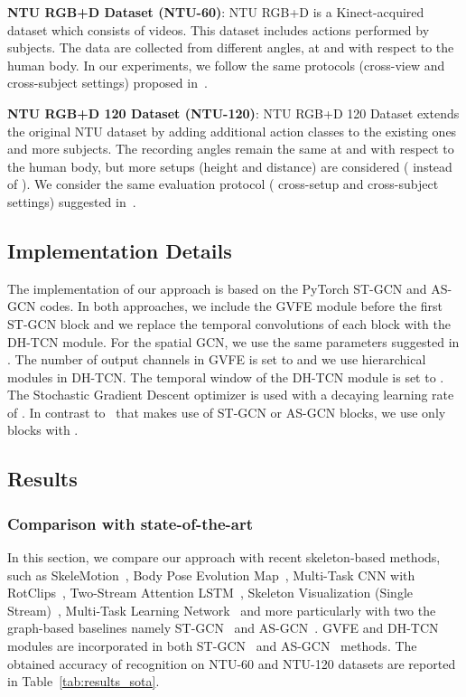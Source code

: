 \documentclass{article}
\begin{document}
\textbf{NTU RGB+D Dataset (NTU-60)}: NTU RGB+D is a Kinect-acquired dataset which consists of  videos. This dataset includes  actions performed by  subjects. The data are collected from  different angles, at  and  with respect to the human body. In our experiments, we follow the same protocols (cross-view and cross-subject settings) proposed in~\cite{Shahroudy_2016_NTURGBD}.

\noindent \textbf{NTU RGB+D 120 Dataset (NTU-120)}: NTU RGB+D 120 Dataset extends the original NTU dataset by adding  additional action classes to the existing ones and  more subjects. The recording angles remain the same at  and  with respect to the human body, but more setups (height and distance) are considered ( instead of ). We consider the same evaluation protocol ( cross-setup and cross-subject settings) suggested in~\cite{Liu_2019_NTURGBD120}.



\subsection{Implementation Details}
\label{sec:implementation}

The implementation of our approach is based on the PyTorch ST-GCN \cite{yan2018spatial} and AS-GCN \cite{li2019actional} codes. In both approaches, we include the GVFE module before the first ST-GCN block and we replace the temporal convolutions of each block with the DH-TCN module. For the spatial GCN, we use the same parameters suggested in \cite{yan2018spatial}. The number of output channels in GVFE is set to  and we use  hierarchical modules in DH-TCN. The temporal window of the DH-TCN module is set to . The Stochastic Gradient Descent optimizer is used with a decaying learning rate of . In contrast to~\cite{yan2018spatial, li2019actional} that makes use of  ST-GCN or AS-GCN blocks, we use only  blocks with .

\subsection{Results}
\label{sec:results}



\subsubsection{Comparison with state-of-the-art}

In this section, we compare our approach with recent skeleton-based methods, such as SkeleMotion~\cite{caetano2019skelemotion}, Body Pose Evolution Map~\cite{liu2018recognizing}, Multi-Task CNN with RotClips~\cite{ke2018learning}, Two-Stream Attention LSTM~\cite{liu2017skeleton}, Skeleton Visualization (Single Stream)~\cite{liu2017enhanced}, Multi-Task Learning Network~\cite{ke2017new} and more particularly with two the graph-based baselines namely ST-GCN~\cite{yan2018spatial} and AS-GCN~\cite{li2019actional}. GVFE and DH-TCN modules are incorporated in both ST-GCN~\cite{yan2018spatial} and AS-GCN~\cite{li2019actional} methods. The obtained accuracy of recognition on NTU-60 and NTU-120 datasets are reported in Table~\ref{tab:results_sota}.  
\end{document}

